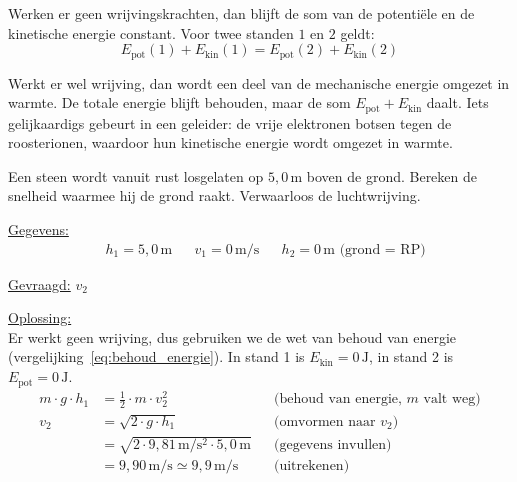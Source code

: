 \documentclass{ximera}
\begin{document}
\begin{proposition}[title={Wet van behoud van mechanische energie}]\nl
    Werken er geen wrijvingskrachten, dan blijft de som van de potentiële en de kinetische energie constant. Voor twee standen $1$ en $2$ geldt:
    \begin{equation}\label{eq:behoud_energie}
        E_{\text{pot}}(1) + E_{\text{kin}}(1) = E_{\text{pot}}(2) + E_{\text{kin}}(2)
    \end{equation}
\end{proposition}

\begin{remark}[title={Met wrijving}]\nl
    Werkt er wel wrijving, dan wordt een deel van de mechanische energie omgezet in warmte. De totale energie blijft behouden, maar de som $E_{\text{pot}} + E_{\text{kin}}$ daalt. Iets gelijkaardigs gebeurt in een geleider: de vrije elektronen botsen tegen de roosterionen, waardoor hun kinetische energie wordt omgezet in warmte.
\end{remark}

\begin{example}[foldable=true,title={Voorbeeld: een vallende steen}]\nl
    Een steen wordt vanuit rust losgelaten op $5{,}0 \, \mathrm{m}$ boven de grond. Bereken de snelheid waarmee hij de grond raakt. Verwaarloos de luchtwrijving.

    \begin{solution}\nl
        \underline{Gegevens:}
        \begin{align*}
            & h_{1} = 5{,}0 \, \mathrm{m} & & v_{1} = 0 \, \mathrm{m/s} & & h_{2} = 0 \, \mathrm{m} \text{ (grond = RP)}
        \end{align*}

        \underline{Gevraagd:} $v_{2}$

        \underline{Oplossing:}\\
        Er werkt geen wrijving, dus gebruiken we de wet van behoud van energie (vergelijking~\ref{eq:behoud_energie}). In stand 1 is $E_{\text{kin}} = 0 \, \mathrm{J}$, in stand 2 is $E_{\text{pot}} = 0 \, \mathrm{J}$.
        \begin{align*}
            m \cdot g \cdot h_{1} &= \frac{1}{2} \cdot m \cdot v_{2}^{2} && \text{(behoud van energie, $m$ valt weg)}\\
            v_{2} &= \sqrt{2 \cdot g \cdot h_{1}} && \text{(omvormen naar $v_{2}$)}\\
            &= \sqrt{2 \cdot 9{,}81 \, \mathrm{m/s^2} \cdot 5{,}0 \, \mathrm{m}} && \text{(gegevens invullen)}\\
            &= 9{,}90 \, \mathrm{m/s} \simeq \boxed{9{,}9 \, \mathrm{m/s}} && \text{(uitrekenen)}
        \end{align*}
    \end{solution}
\end{example}
\end{document}
